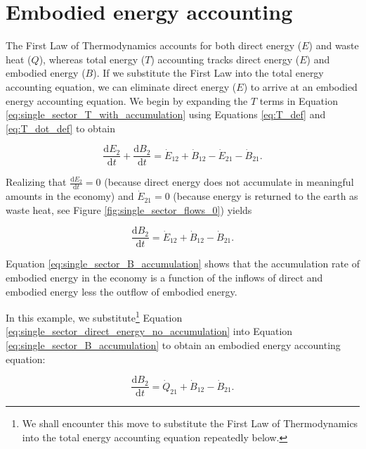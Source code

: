 \section{Embodied energy accounting}

The First Law of Thermodynamics accounts for both direct energy ($E$) and waste heat ($Q$), whereas total energy ($T$) accounting tracks direct energy ($E$) and embodied energy ($B$). If we substitute the First Law into the total energy accounting equation, we can eliminate direct energy ($E$) to arrive at an embodied energy accounting equation. We begin by expanding the $T$ terms in Equation \ref{eq:single_sector_T_with_accumulation} using Equations \ref{eq:T_def} and \ref{eq:T_dot_def} to obtain

\begin{equation} \label{eq:single_sector_T_with_accumulation_expanded_T}
	\frac{\mathrm{d}E_{2}}{\mathrm{d}t} + \frac{\mathrm{d}B_{2}}{\mathrm{d}t} = \dot{E}_{12} + \dot{B}_{12} - \dot{E}_{21} - \dot{B}_{21}.
\end{equation}

\noindent Realizing that $\frac{\mathrm{d}E_2}{\mathrm{d}t} = 0$ (because direct energy does not accumulate in meaningful amounts in the economy) and $\dot{E}_{21} = 0$ (because energy is returned to the earth as waste heat, see Figure \ref{fig:single_sector_flows_0}) yields

\begin{equation} \label{eq:single_sector_B_accumulation}
	\frac{\mathrm{d}B_{2}}{\mathrm{d}t} = \dot{E}_{12} + \dot{B}_{12} - \dot{B}_{21}.
\end{equation}

\noindent Equation \ref{eq:single_sector_B_accumulation} shows that the accumulation rate of embodied energy in the economy is a function of the inflows of direct and embodied energy less the outflow of embodied energy. 

In this example, we substitute\footnote{We shall encounter this move to substitute the First Law of Thermodynamics into the total energy accounting equation repeatedly below.} Equation \ref{eq:single_sector_direct_energy_no_accumulation} into Equation \ref{eq:single_sector_B_accumulation} to obtain an embodied energy accounting equation:

\begin{equation} \label{eq:embodied_energy_accounting}
	\frac{\mathrm{d}B_{2}}{\mathrm{d}t} = \dot{Q}_{21} + \dot{B}_{12} - \dot{B}_{21}.
\end{equation}

